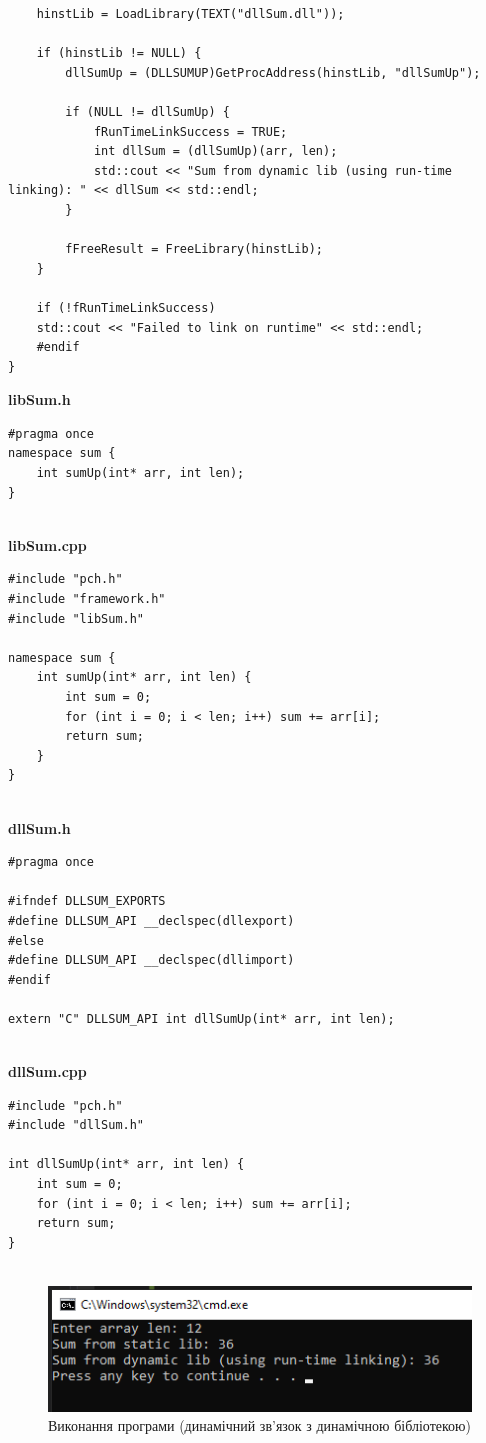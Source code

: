 \documentclass{article}
\begin{document}
\begin{normalsize}
\begin{lstlisting}
	hinstLib = LoadLibrary(TEXT("dllSum.dll"));
	
	if (hinstLib != NULL) {
		dllSumUp = (DLLSUMUP)GetProcAddress(hinstLib, "dllSumUp");
		
		if (NULL != dllSumUp) {
			fRunTimeLinkSuccess = TRUE;
			int dllSum = (dllSumUp)(arr, len);
			std::cout << "Sum from dynamic lib (using run-time linking): " << dllSum << std::endl;
		}
		
		fFreeResult = FreeLibrary(hinstLib);
	}
	
	if (!fRunTimeLinkSuccess)
	std::cout << "Failed to link on runtime" << std::endl;
	#endif
}

	\end{lstlisting}
	
	\noindent\textbf{libSum.h}
	\begin{lstlisting}
#pragma once
namespace sum {
	int sumUp(int* arr, int len);
}
		
	\end{lstlisting}

	\noindent\textbf{libSum.cpp}
	\begin{lstlisting}
#include "pch.h"
#include "framework.h"
#include "libSum.h"

namespace sum {
	int sumUp(int* arr, int len) {
		int sum = 0;
		for (int i = 0; i < len; i++) sum += arr[i];
		return sum;
	}
}
		
	\end{lstlisting}
	
	\noindent\textbf{dllSum.h}
	\begin{lstlisting}
#pragma once

#ifndef DLLSUM_EXPORTS
#define DLLSUM_API __declspec(dllexport)
#else
#define DLLSUM_API __declspec(dllimport)
#endif

extern "C" DLLSUM_API int dllSumUp(int* arr, int len);
		
	\end{lstlisting}
		
	\noindent\textbf{dllSum.cpp}
	\begin{lstlisting}
#include "pch.h"
#include "dllSum.h"

int dllSumUp(int* arr, int len) {
	int sum = 0;
	for (int i = 0; i < len; i++) sum += arr[i];
	return sum;
}
		
	\end{lstlisting}
	
	\begin{figure}[H]
		\centering
		\includegraphics[scale=0.9]{1}
		\caption{Виконання програми (динамічний зв'язок з динамічною бібліотекою)}
	\end{figure}


\end{normalsize}
\end{document}
